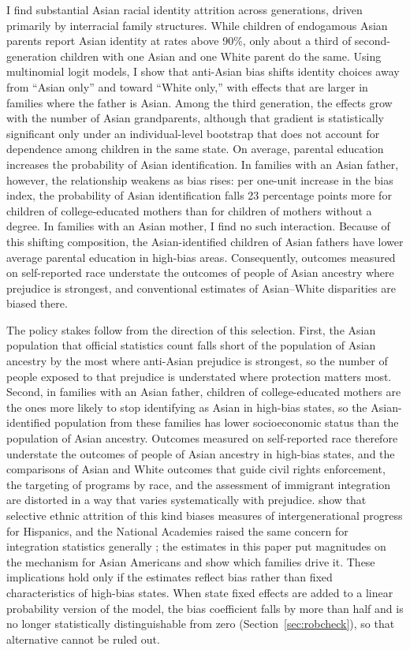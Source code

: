 I find substantial Asian racial identity attrition across generations, driven primarily by interracial family structures. While children of endogamous Asian parents report Asian identity at rates above 90\%, only about a third of second-generation children with one Asian and one White parent do the same. Using multinomial logit models, I show that anti-Asian bias shifts identity choices away from ``Asian only'' and toward ``White only,'' with effects that are larger in families where the father is Asian. Among the third generation, the effects grow with the number of Asian grandparents, although that gradient is statistically significant only under an individual-level bootstrap that does not account for dependence among children in the same state. On average, parental education increases the probability of Asian identification. In families with an Asian father, however, the relationship weakens as bias rises: per one-unit increase in the bias index, the probability of Asian identification falls 23 percentage points more for children of college-educated mothers than for children of mothers without a degree. In families with an Asian mother, I find no such interaction. Because of this shifting composition, the Asian-identified children of Asian fathers have lower average parental education in high-bias areas. Consequently, outcomes measured on self-reported race understate the outcomes of people of Asian ancestry where prejudice is strongest, and conventional estimates of Asian--White disparities are biased there.

The policy stakes follow from the direction of this selection. First, the Asian population that official statistics count falls short of the population of Asian ancestry by the most where anti-Asian prejudice is strongest, so the number of people exposed to that prejudice is understated where protection matters most. Second, in families with an Asian father, children of college-educated mothers are the ones more likely to stop identifying as Asian in high-bias states, so the Asian-identified population from these families has lower socioeconomic status than the population of Asian ancestry. Outcomes measured on self-reported race therefore understate the outcomes of people of Asian ancestry in high-bias states, and the comparisons of Asian and White outcomes that guide civil rights enforcement, the targeting of programs by race, and the assessment of immigrant integration are distorted in a way that varies systematically with prejudice. \textcite{duncanIdentifyingLaterGenerationDescendants2018} show that selective ethnic attrition of this kind biases measures of intergenerational progress for Hispanics, and the National Academies raised the same concern for integration statistics generally \autocite{watersIntegrationImmigrantsAmerican2015}; the estimates in this paper put magnitudes on the mechanism for Asian Americans and show which families drive it. These implications hold only if the estimates reflect bias rather than fixed characteristics of high-bias states. When state fixed effects are added to a linear probability version of the model, the bias coefficient falls by more than half and is no longer statistically distinguishable from zero (Section~\ref{sec:robcheck}), so that alternative cannot be ruled out.

